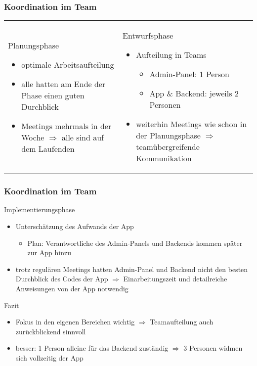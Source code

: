 \begin{frame}\frametitle{Koordination im Team}
        	\begin{tabular}{l l}
        	\begin{tcolorbox}[width=.4\textwidth]
        	Planungsphase
        	\begin{itemize}
        		\item optimale Arbeitsaufteilung
        		\item alle hatten am Ende der Phase einen guten Durchblick
        		\item Meetings mehrmals in der Woche $\Rightarrow$ alle sind auf dem Laufenden
        	\end{itemize}
        	\end{tcolorbox} &
        	\begin{tcolorbox}[width=.5\textwidth]
        	Entwurfsphase
        	\begin{itemize}
        		\item Aufteilung in Teams
        		\begin{itemize}
        			\item Admin-Panel: 1 Person
        			\item App \& Backend: jeweils 2 Personen
        		\end{itemize}
        	\item weiterhin Meetings wie schon in der Planungsphase $\Rightarrow$ teamübergreifende Kommunikation
     	\end{itemize}
        	\end{tcolorbox} \\
        	\end{tabular}
\end{frame}

\begin{frame}\frametitle{Koordination im Team}
   	\begin{tcolorbox}[width=.9\textwidth]
   	Implementierungsphase
   		\begin{itemize}
   		\item Unterschätzung des Aufwands der App
   		\begin{itemize}
   			\item Plan: Verantwortliche des Admin-Panels und Backends kommen später zur App hinzu
   		\end{itemize}
   		\item trotz regulären Meetings hatten Admin-Panel und Backend nicht den besten Durchblick des Codes der App $\Rightarrow$ Einarbeitungszeit und detailreiche Anweisungen von der App notwendig
   	\end{itemize}
    \end{tcolorbox}
    Fazit
    \begin{itemize}
        	\item Fokus in den eigenen Bereichen wichtig $\Rightarrow$ Teamaufteilung auch zurückblickend sinnvoll
        	\item besser: 1 Person alleine für das Backend zuständig $\Rightarrow$ 3 Personen widmen sich vollzeitig der App
    \end{itemize}
\end{frame}
